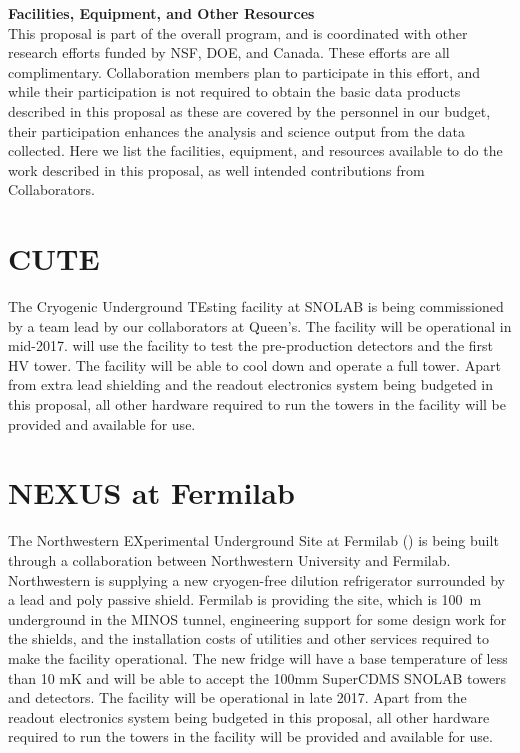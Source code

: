 
\clearpage
\rhead{}
\setcounter{section}{0}
\noindent\textbf{\LARGE{Facilities, Equipment, and Other Resources}}\\

\label{facilities}
This proposal  is  part of the overall \scs program, and is coordinated with other research efforts funded by NSF, DOE, and Canada. These efforts are all complimentary. \SuperCDMS Collaboration members plan to participate in this effort, and while their participation is not required to obtain the basic data products described in this proposal as these are covered by the personnel in our budget, their participation enhances the analysis and science output from the data collected. Here we list the facilities, equipment, and resources available to do the work described in this proposal, as well intended contributions from Collaborators.

\section{CUTE}
The Cryogenic Underground TEsting facility at SNOLAB is being commissioned by a team lead by our collaborators at Queen's. The facility will be operational in mid-2017. \scs will use the facility to test the pre-production \scs detectors and the first \scs HV tower. The  facility will be able to cool down and operate a full \scs tower. Apart from extra lead shielding and the readout electronics system being budgeted in this proposal, all other hardware required to run the towers in the facility will be provided and available for use. 

\section{NEXUS at Fermilab}
The Northwestern EXperimental Underground Site at Fermilab (\nexus) is being built through a collaboration between Northwestern University and Fermilab. Northwestern is supplying a new cryogen-free dilution refrigerator surrounded by a lead and poly passive shield. Fermilab is providing the site, which is 100~m underground in the MINOS tunnel, engineering support for some design work for the shields, and the installation costs of utilities and other services required to make the facility operational. The new fridge will have a base temperature of less than 10 mK and will be able to accept the 100mm SuperCDMS SNOLAB towers and detectors. The facility will be operational in late 2017. Apart from  the readout electronics system being budgeted in this proposal, all other hardware required to run the towers in the facility will be provided and available for use.

